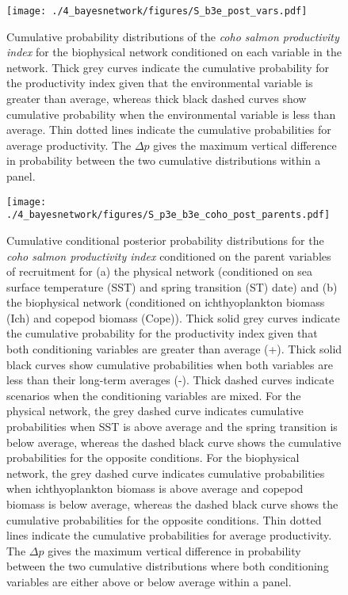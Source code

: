 \begin{figure}[htbp]
  \centering \texttt{[image: ./4\_bayesnetwork/figures/S\_b3e\_post\_vars.pdf]}
  \caption[Cumulative probability distributions of the coho salmon productivity
           index for the biophysical network conditioned on each variable in the
           network.]{Cumulative probability distributions of the \emph{coho
           salmon productivity index} for the biophysical network conditioned on
           each variable in the network. Thick grey curves indicate the
           cumulative probability for the productivity index given that the
           environmental variable is greater than average, whereas thick black
           dashed curves show cumulative probability when the environmental
           variable is less than average. Thin dotted lines indicate the
           cumulative probabilities for average productivity. The \(\Delta p\)
           gives the maximum vertical difference in probability between the two
           cumulative distributions within a panel.}
  \label{fig:bn:s3}
\end{figure}

\begin{figure}[htbp]
  \centering \texttt{[image: ./4\_bayesnetwork/figures/S\_p3e\_b3e\_coho\_post\_parents.pdf]}
  \caption[Cumulative conditional posterior probability distributions for the
           coho salmon productivity index conditioned on the parent variables of
           recruitment.]{Cumulative conditional posterior probability
           distributions for the \emph{coho salmon productivity index}
           conditioned on the parent variables of recruitment for (a) the
           physical network (conditioned on sea surface temperature (SST) and
           spring transition (ST) date) and (b) the biophysical network
           (conditioned on ichthyoplankton biomass (Ich) and copepod biomass
           (Cope)). Thick solid grey curves indicate the cumulative probability
           for the productivity index given that both conditioning variables are
           greater than average (+). Thick solid black curves show cumulative
           probabilities when both variables are less than their long-term
           averages (-). Thick dashed curves indicate scenarios when the
           conditioning variables are mixed. For the physical network, the grey
           dashed curve indicates cumulative probabilities when SST is above
           average and the spring transition is below average, whereas the
           dashed black curve shows the cumulative probabilities for the
           opposite conditions. For the biophysical network, the grey dashed
           curve indicates cumulative probabilities when ichthyoplankton biomass
           is above average and copepod biomass is below average, whereas the
           dashed black curve shows the cumulative probabilities for the
           opposite conditions.  Thin dotted lines indicate the cumulative
           probabilities for average productivity. The \(\Delta p\) gives the
           maximum vertical difference in probability between the two cumulative
           distributions where both conditioning variables are either above or
           below average within a panel.} 
  \label{fig:bn:s4}
\end{figure}
